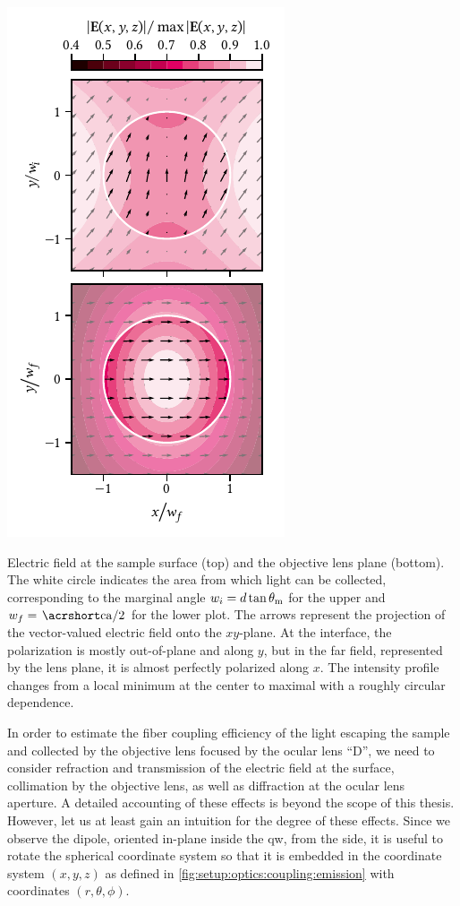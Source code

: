\begin{marginfigure}[*-14]
    \centering
    \includegraphics{img/pdf/setup/modes_2d}
    \caption[]{
        Electric field at the sample surface (top) and the objective lens plane (bottom).
        The white circle indicates the area from which light can be collected, corresponding to the marginal angle $w_i = d\tan\theta_{\mathrm{m}}$ for the upper and $w_f = \flatfrac{\CA}{2}$ for the lower plot.
        The arrows represent the projection of the vector-valued electric field onto the $xy$-plane.
        At the interface, the polarization is mostly out-of-plane and along $y$, but in the far field, represented by the lens plane, it is almost perfectly polarized along $x$.
        The intensity profile changes from a local minimum at the center to maximal with a roughly circular dependence.
    }
    \label{fig:setup:optics:coupling:modes_2d}
\end{marginfigure}

In order to estimate the fiber coupling efficiency of the light escaping the sample and collected by the objective lens focused by the ocular lens \enquote{D}, we need to consider refraction and transmission of the electric field at the surface, collimation by the objective lens, as well as diffraction at the ocular lens aperture.
A detailed accounting of these effects is beyond the scope of this thesis.
However, let us at least gain an intuition for the degree of these effects.
Since we observe the dipole, oriented in-plane inside the \gls{qw}, from the side, it is useful to rotate the spherical coordinate system so that it is embedded in the coordinate system $(x, y, z)$ as defined in \cref{fig:setup:optics:coupling:emission} with coordinates $(r, \theta, \phi)$.

